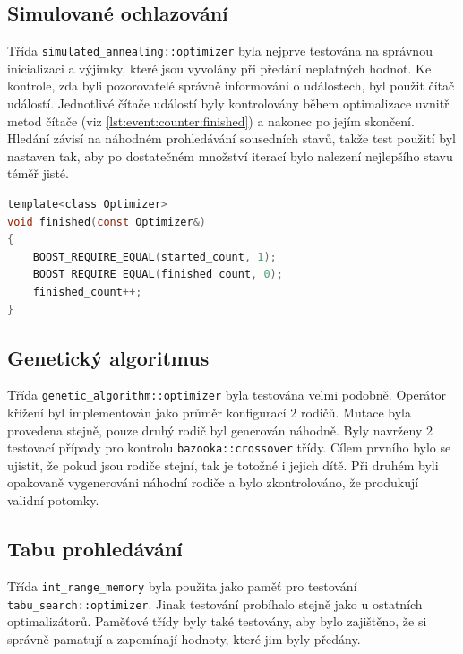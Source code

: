\subsection{Simulované ochlazování}
Třída \texttt{simulated\_annealing::optimizer} byla nejprve testována na správnou inicializaci a výjimky, které jsou vyvolány při předání neplatných hodnot.
Ke kontrole, zda byli pozorovatelé správně informováni o událostech, byl použit čítač událostí.
Jednotlivé čítače událostí byly kontrolovány během optimalizace uvnitř metod čítače (viz \ref{lst:event:counter:finished}) a nakonec po jejím skončení.
Hledání závisí na náhodném prohledávání sousedních stavů, takže test použití byl nastaven tak, aby po dostatečném množství iterací bylo nalezení nejlepšího stavu téměř jisté.

\begin{lstlisting}[caption={~Kontrola hodnot čítače uvnitř metody \texttt{finished}},label={lst:event:counter:finished},captionpos=t,abovecaptionskip=-\medskipamount,belowcaptionskip=\medskipamount,language=C]
template<class Optimizer>
void finished(const Optimizer&)
{
    BOOST_REQUIRE_EQUAL(started_count, 1);
    BOOST_REQUIRE_EQUAL(finished_count, 0);
    finished_count++;
}
\end{lstlisting}

\subsection{Genetický algoritmus}
Třída \texttt{genetic\_algorithm::optimizer} byla testována velmi podobně.
Operátor křížení byl implementován jako průměr konfigurací 2 rodičů.
Mutace byla provedena stejně, pouze druhý rodič byl generován náhodně.
Byly navrženy 2 testovací případy pro kontrolu \texttt{bazooka::crossover} třídy.
Cílem prvního bylo se ujistit, že pokud jsou rodiče stejní, tak je totožné i jejich dítě.
Při druhém byli opakovaně vygenerováni náhodní rodiče a bylo zkontrolováno, že produkují validní potomky.

\subsection{Tabu prohledávání}
Třída \texttt{int\_range\_memory} byla použita jako paměť pro testování \texttt{tabu\_search::optimizer}.
Jinak testování probíhalo stejně jako u ostatních optimalizátorů.
Paměťové třídy byly také testovány, aby bylo zajištěno, že si správně pamatují a zapomínají hodnoty, které jim byly předány.

